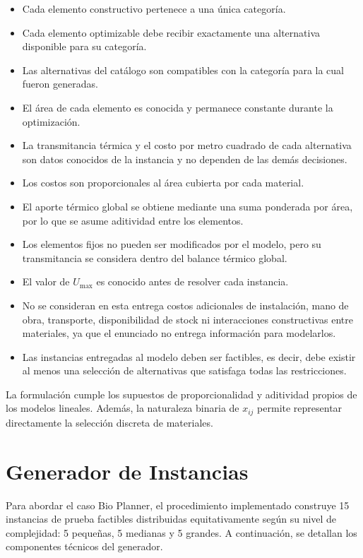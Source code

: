 \documentclass[journal, 12pt, onecolumn]{IEEEtran}
\begin{document}
\begin{itemize}
    \item Cada elemento constructivo pertenece a una única categoría.
    \item Cada elemento optimizable debe recibir exactamente una alternativa
    disponible para su categoría.
    \item Las alternativas del catálogo son compatibles con la categoría
    para la cual fueron generadas.
    \item El área de cada elemento es conocida y permanece constante durante
    la optimización.
    \item La transmitancia térmica y el costo por metro cuadrado de cada
    alternativa son datos conocidos de la instancia y no dependen de las
    demás decisiones.
    \item Los costos son proporcionales al área cubierta por cada material.
    \item El aporte térmico global se obtiene mediante una suma ponderada por
    área, por lo que se asume aditividad entre los elementos.
    \item Los elementos fijos no pueden ser modificados por el modelo, pero su
    transmitancia se considera dentro del balance térmico global.
    \item El valor de $U_{\max}$ es conocido antes de resolver cada instancia.
    \item No se consideran en esta entrega costos adicionales de instalación,
    mano de obra, transporte, disponibilidad de stock ni interacciones
    constructivas entre materiales, ya que el enunciado no entrega información
    para modelarlos.
    \item Las instancias entregadas al modelo deben ser factibles, es decir,
    debe existir al menos una selección de alternativas que satisfaga todas
    las restricciones.
\end{itemize}

La formulación cumple los supuestos de proporcionalidad y aditividad propios
de los modelos lineales. Además, la naturaleza binaria de $x_{ij}$ permite
representar directamente la selección discreta de materiales.

\section{Generador de Instancias}

Para abordar el caso Bio Planner, el procedimiento implementado construye 15 instancias de prueba factibles distribuidas equitativamente según su nivel de complejidad: 5 pequeñas, 5 medianas y 5 grandes. A continuación, se detallan los componentes técnicos del generador.
\end{document}
